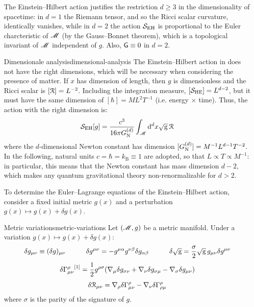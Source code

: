 The Einstein--Hilbert action justifies the restriction $ d \geq 3 $ in the dimensionality of spacetime: in $ d = 1 $ the Riemann tensor, and so the Ricci scalar curvature, identically vanishes, while in $ d = 2 $ the action $ \mathcal{S}_\text{EH} $ is proportional to the Euler charcteristic of $ \mathscr{M} $ (by the Gauss--Bonnet theorem), which is a topological invariant of $ \mathscr{M} $ independent of $ g $. Also, $ \textsf{G} \equiv 0 $ in $ d = 2 $.

\begin{observation}{Dimensionale analysis}{dimensional-analysis}
  The Einstein--Hilbert action in  does not have the right dimensions, which will be necessary when considering the presence of matter.
  If $ x $ has dimension of length, then $ g $ is dimensionless and the Ricci scalar is $ [\EuScript{R}] = L^{-2} $. Including the integration measure, $ [\mathcal{S}_\text{HE}] = L^{d - 2} $, but it must have the same dimension of $ [\hbar] =  M L^2 T^{-1} $ (i.e. energy $ \times $ time). Thus, the action with the right dimension is:
  \begin{equation}
    \mathcal{S}_\text{EH}[g] = \frac{c^3}{16 \pi G_\text{N}^{(d)}} \int_\mathscr{M} \mathrm{d}^d x \sqrt{\mathrm{g}} \, \EuScript{R}
    \label{eq:einstein-hilbert}
  \end{equation}
  where the $ d $-dimensional Newton constant has dimension $ [G_\text{N}^{(d)}] = M^{-1} L^{d-1} T^{-2} $. In the following, natural units $ c = \hbar = k_\text{B} \equiv 1 $ are adopted, so that $ L \propto T \propto M^{-1} $: in particular, this means that the Newton constant has mass dimension $ d - 2 $, which makes any quantum gravitational theory non-renormalizable for $ d > 2 $.
\end{observation}

To determine the Euler--Lagrange equations of the Einstein--Hilbert action, consider a fixed initial metric $ g(x) $ and a perturbation $ g(x) \mapsto g(x) + \delta g(x) $.

\begin{lemma}{Metric variations}{metric-variations}
  Let $ (\mathscr{M} , g) $ be a metric manifold. Under a variation $ g(x) \mapsto g(x) + \delta g(x) $:
  \begin{equation}
    \delta g_{\mu \nu} \equiv (\delta g)_{\mu \nu}
    \qquad \quad
    \delta g^{\mu \nu} = - g^{\mu \alpha} g^{\nu \beta} \delta g_{\alpha \beta}
    \qquad \quad
    \delta \sqrt{\mathrm{g}} = \frac{\sigma}{2} \sqrt{\mathrm{g}}\, g_{\mu \nu} \delta g^{\mu \nu}
  \end{equation}
  \begin{equation}
    \delta {\Gamma^\rho_{\mu \nu}}^{[1]} = \frac{1}{2} g^{\rho \sigma} ( \nabla_\mu \delta g_{\sigma \nu} + \nabla_\nu \delta g_{\sigma \mu} - \nabla_\sigma \delta g_{\mu \nu} )
  \end{equation}
  \begin{equation}
    \delta \EuScript{R}_{\mu \nu} = \nabla_\rho \delta \Gamma^\rho_{\mu \nu} - \nabla_\nu \delta \Gamma^\rho_{\rho \mu}
  \end{equation}
  where $ \sigma $ is the parity of the signature of $ g $.
\end{lemma}

